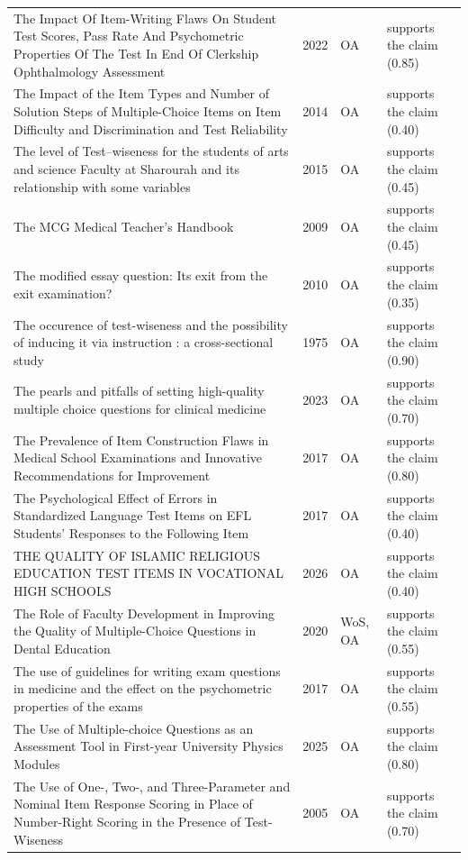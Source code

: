 \begin{longtable}{@{}%
  >{\raggedright\arraybackslash}p{}c%
  >{\raggedright\arraybackslash}p{}%
  >{\raggedright\arraybackslash}p{}@{}}
The Impact Of Item-Writing Flaws On Student Test Scores, Pass Rate And Psychometric Properties Of The Test In End Of Clerkship Ophthalmology Assessment & 2022 & OA & supports the claim (0.85) \\
The Impact of the Item Types and Number of Solution Steps of Multiple-Choice Items on Item Difficulty and Discrimination and Test Reliability & 2014 & OA & supports the claim (0.40) \\
The level of Test--wiseness for the students of arts and science Faculty at Sharourah and its relationship with some variables & 2015 & OA & supports the claim (0.45) \\
The MCG Medical Teacher's Handbook & 2009 & OA & supports the claim (0.45) \\
The modified essay question: Its exit from the exit examination? & 2010 & OA & supports the claim (0.35) \\
The occurence of test-wiseness and the possibility of inducing it via instruction : a cross-sectional study & 1975 & OA & supports the claim (0.90) \\
The pearls and pitfalls of setting high-quality multiple choice questions for clinical medicine & 2023 & OA & supports the claim (0.70) \\
The Prevalence of Item Construction Flaws in Medical School Examinations and Innovative Recommendations for Improvement & 2017 & OA & supports the claim (0.80) \\
The Psychological Effect of Errors in Standardized Language Test Items on EFL Students' Responses to the Following Item & 2017 & OA & supports the claim (0.40) \\
THE QUALITY OF ISLAMIC RELIGIOUS EDUCATION TEST ITEMS IN VOCATIONAL HIGH SCHOOLS & 2026 & OA & supports the claim (0.40) \\
The Role of Faculty Development in Improving the Quality of Multiple-Choice Questions in Dental Education & 2020 & WoS, OA & supports the claim (0.55) \\
The use of guidelines for writing exam questions in medicine and the effect on the psychometric properties of the exams & 2017 & OA & supports the claim (0.55) \\
The Use of Multiple-choice Questions as an Assessment Tool in First-year University Physics Modules & 2025 & OA & supports the claim (0.80) \\
The Use of One-, Two-, and Three-Parameter and Nominal Item Response Scoring in Place of Number-Right Scoring in the Presence of Test-Wiseness & 2005 & OA & supports the claim (0.70) \\

\end{longtable}
